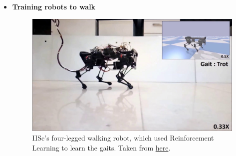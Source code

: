 \documentclass{article}
\begin{document}
\begin{itemize}
\begin{figure}[h]
                \end{figure}

            \clearpage

            \item \textbf{Training robots to walk}
                \begin{figure}[h]
                    \includegraphics[width = \textwidth]{stotcj.jpg}
                    \caption{IISc's four-legged walking robot, which used Reinforcement Learning to learn the gaits. Taken from \href{https://cps.iisc.ac.in/research/walking-robot/}{here}.}
                \end{figure}
        \end{itemize}
        
        \clearpage
\end{document}
